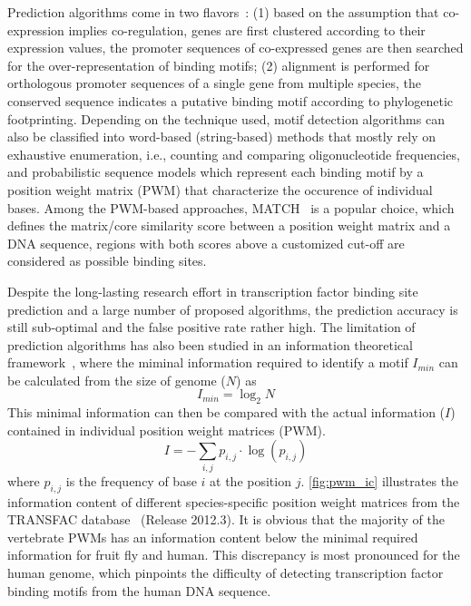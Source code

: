 Prediction algorithms come in two flavors~\citep{Das2007}: 
(1) based on the
assumption that co-expression implies co-regulation, genes are 
first clustered according to their expression values, the promoter sequences
of co-expressed genes are then searched for the over-representation of 
binding motifs; (2) alignment is performed for orthologous promoter sequences of a single gene from multiple species, the conserved sequence indicates a putative
binding motif according to phylogenetic footprinting. Depending on the 
technique used, motif detection algorithms can also be classified into
word-based (string-based) methods that mostly rely on exhaustive enumeration, i.e., counting and comparing oligonucleotide frequencies, and probabilistic sequence models which
represent each binding motif by a position weight matrix (PWM) that characterize
the occurence of individual bases.
Among the PWM-based approaches, MATCH~\citep{Kel2003} is a popular choice, which 
defines the matrix/core similarity score between a position weight matrix and
a DNA sequence, regions with both scores above a customized cut-off are considered
as possible binding sites.

Despite the long-lasting research effort in transcription factor binding site
prediction and a large number of proposed algorithms, the prediction accuracy 
is still sub-optimal and the false positive rate rather high. The limitation of
prediction algorithms has also been studied in an information theoretical
framework~\citep{Wunderlich2009}, where the miminal information required to identify a motif $I_{min}$ can be calculated from the size of genome ($N$) as
\begin{equation}
I_{min}=\log_2 N
\end{equation}
This minimal information can then be compared with the actual information ($I$) 
contained in individual position weight matrices (PWM).
\begin{equation}
\displaystyle I = -\sum_{i,j}p_{i,j} \cdot \log(p_{i,j})
\end{equation}
where $p_{i,j}$ is the frequency of base $i$ at the position $j$. \ref{fig:pwm_ic}
illustrates the information content of different species-specific position 
weight matrices from the TRANSFAC database~\citep{Matys2003b} (Release 2012.3). 
It is obvious that
the majority of the vertebrate PWMs has an information content below the 
minimal required information for fruit fly and human. This discrepancy is most
pronounced for the human genome, which pinpoints the difficulty of detecting 
transcription factor binding motifs from the human DNA sequence.

